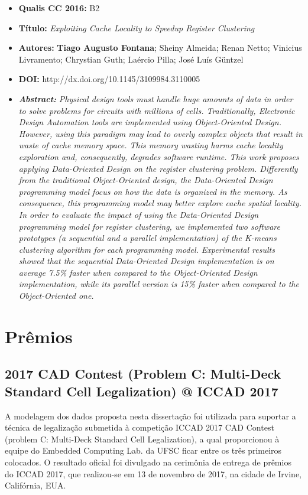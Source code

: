 \begin{itemize}
\item \textbf{Qualis CC 2016:} B2
\item \textbf{Título:} \textit{Exploiting Cache Locality to Speedup Register Clustering}
\item \textbf{Autores:}  \textbf{Tiago Augusto Fontana}; Sheiny Almeida; Renan Netto; Vinicius Livramento; Chrystian Guth;  Laércio Pilla; José Luís Güntzel
\item \textbf{DOI:} http://dx.doi.org/10.1145/3109984.3110005
\item \textbf{\textit{Abstract:}} \emph{Physical design tools must handle huge amounts of data in order to solve problems for circuits with millions of cells. Traditionally, Electronic Design Automation tools are implemented using Object-Oriented Design. However, using this paradigm may lead to overly complex objects that result in waste of cache memory space. This memory wasting harms cache locality exploration and, consequently, degrades software runtime. This work proposes applying Data-Oriented Design on the register clustering problem. Differently from the traditional Object-Oriented design, the Data-Oriented Design programming model focus on how the data is organized in the memory. As consequence, this programming model may better explore cache spatial locality. In order to evaluate the impact of using the Data-Oriented Design programming model for register clustering, we implemented two software prototypes (a sequential and a parallel implementation) of the K-means clustering algorithm for each programming model. Experimental results showed that the sequential Data-Oriented Design implementation is on average 7.5\% faster when compared to the Object-Oriented Design implementation, while its parallel version is 15\% faster when compared to the Object-Oriented one.}
\end{itemize}

\section{Prêmios}
\subsection{2017 CAD Contest (Problem C: Multi-Deck Standard Cell Legalization) @ ICCAD 2017}

A modelagem dos dados proposta nesta dissertação foi utilizada para suportar a técnica de legalização submetida à competição ICCAD 2017 CAD Contest (problem C: Multi-Deck Standard Cell Legalization), a qual proporcionou à equipe do Embedded Computing Lab. da UFSC ficar entre os três primeiros colocados.
O resultado oficial foi divulgado na cerimônia de entrega de prêmios do ICCAD 2017, que realizou-se em 13 de novembro de 2017, na cidade de Irvine, Califórnia, EUA.

